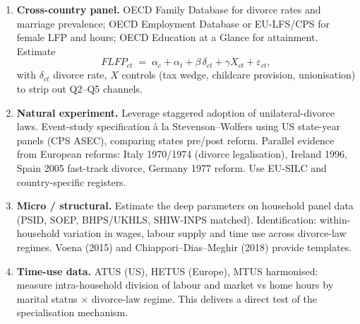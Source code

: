 \documentclass[11pt,a4paper]{article}
\begin{document}
\begin{enumerate}[leftmargin=*,itemsep=2pt]
    \item \textbf{Cross-country panel.} OECD Family Database for divorce rates and marriage prevalence; OECD Employment Database or EU-LFS/CPS for female LFP and hours; OECD Education at a Glance for attainment. Estimate
    \[
    FLFP_{ct}\;=\;\alpha_c+\alpha_t+\beta\,\delta_{ct}+\gamma X_{ct}+\varepsilon_{ct},
    \]
    with $\delta_{ct}$ divorce rate, $X$ controls (tax wedge, childcare provision, unionisation) to strip out Q2--Q5 channels.

    \item \textbf{Natural experiment.} Leverage staggered adoption of unilateral-divorce laws. Event-study specification à la Stevenson--Wolfers using US state-year panels (CPS ASEC), comparing states pre/post reform. Parallel evidence from European reforms: Italy 1970/1974 (divorce legalisation), Ireland 1996, Spain 2005 fast-track divorce, Germany 1977 reform. Use EU-SILC and country-specific registers.

    \item \textbf{Micro / structural.} Estimate the deep parameters on household panel data (PSID, SOEP, BHPS/UKHLS, SHIW-INPS matched). Identification: within-household variation in wages, labour supply and time use across divorce-law regimes. Voena (2015) and Chiappori--Dias--Meghir (2018) provide templates.

    \item \textbf{Time-use data.} ATUS (US), HETUS (Europe), MTUS harmonised: measure intra-household division of labour and market vs home hours by marital status $\times$ divorce-law regime. This delivers a direct test of the specialisation mechanism.
\end{enumerate}
\end{document}
